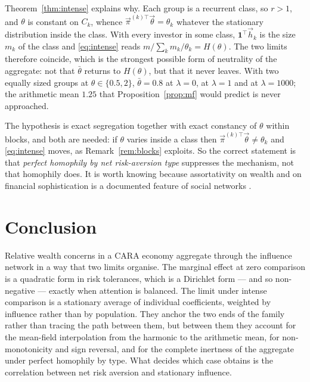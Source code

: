 \documentclass[12pt]{article}
\theoremstyle{definition}
\theoremstyle{remark}
\newcommand{\bth}{\bar\theta}
\begin{document}
Theorem~\ref{thm:intense} explains why. Each group is a recurrent class, so
$r>1$, and $\theta$ is constant on $C_k$, whence
$\vec\pi^{(k)\top}\vec\theta=\theta_k$ whatever the stationary distribution
inside the class. With every investor in some class, $\mathbf 1^{\top}\vec h_k$
is the size $m_k$ of the class and \eqref{eq:intense} reads
$m/\sum_km_k/\theta_k=H(\theta)$. The two limits therefore coincide, which is
the strongest possible form of neutrality of the aggregate: not that $\bth$
returns to $H(\theta)$, but that it never leaves. With two equally sized groups
at $\theta\in\{0.5,2\}$, $\bth=0.8$ at $\lambda=0$, at $\lambda=1$ and at
$\lambda=1000$; the arithmetic mean $1.25$ that Proposition~\ref{prop:mf} would
predict is never approached.

The hypothesis is exact segregation together with exact constancy of $\theta$
within blocks, and both are needed: if $\theta$ varies inside a class then
$\vec\pi^{(k)\top}\vec\theta\neq\theta_k$ and \eqref{eq:intense} moves, as
Remark~\ref{rem:blocks} exploits. So the correct statement is that
\emph{perfect homophily by net risk-aversion type} suppresses the mechanism, not
that homophily does. It is worth knowing because assortativity on wealth and on
financial sophistication is a documented feature of social networks
\cite{mcpherson,bailey}.


\section{Conclusion}

Relative wealth concerns in a CARA economy aggregate through the influence
network in a way that two limits organise. The marginal effect at
zero comparison is a quadratic form in risk tolerances, which is a Dirichlet
form --- and so non-negative --- exactly when attention is balanced. The limit
under intense comparison is a stationary average of individual coefficients,
weighted by influence rather than by population. They anchor the two ends of the family rather than tracing the path between
them, but between them they account for the mean-field interpolation from the
harmonic to the arithmetic mean, for non-monotonicity and sign reversal, and
for the complete inertness of the aggregate under perfect homophily by type. What decides which
case obtains is the correlation between net risk aversion and stationary
influence.
\end{document}
